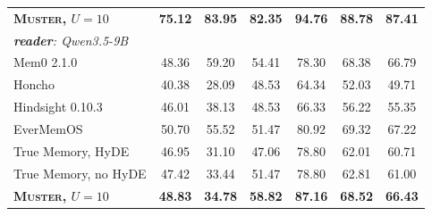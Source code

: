 \documentclass{article}
\newcommand{\ours}{\rowcolor{oursbg}}
\newcommand{\sys}{\textsc{Muster}}
\begin{document}
\begin{table}[!t]
\begin{tabular}{lcccccc}
\ours \textbf{\sys{}, $U{=}10$} & \textbf{75.12} & \textbf{83.95} & \textbf{82.35} & \textbf{94.76} & \textbf{88.78} & \textbf{87.41} \\
\multicolumn{7}{l}{\emph{\textbf{reader}: Qwen3.5-9B}}\\
Mem0 2.1.0 & 48.36 & 59.20 & 54.41 & 78.30 & 68.38 & 66.79 \\
Honcho & 40.38 & 28.09 & 48.53 & 64.34 & 52.03 & 49.71 \\
Hindsight 0.10.3 & 46.01 & 38.13 & 48.53 & 66.33 & 56.22 & 55.35 \\
EverMemOS & 50.70 & 55.52 & 51.47 & 80.92 & 69.32 & 67.22 \\
True Memory, HyDE & 46.95 & 31.10 & 47.06 & 78.80 & 62.01 & 60.71 \\
True Memory, no HyDE & 47.42 & 33.44 & 51.47 & 78.80 & 62.81 & 61.00 \\
\ours \textbf{\sys{}, $U{=}10$} & \textbf{48.83} & \textbf{34.78} & \textbf{58.82} & \textbf{87.16} & \textbf{68.52} & \textbf{66.43} \\
\bottomrule
\end{tabular}
\end{table}
\end{document}
